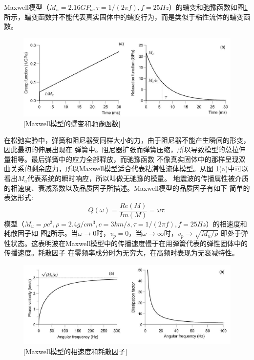 Maxwell模型（$M_u=2.16GP_a,\tau=1/(2\pi f),f=25Hz$）的蠕变和驰豫函数如图\ref{fig:maxwell_creep}
所示，蠕变函数并不能代表真实固体中的蠕变行为，而是类似于粘性流体的蠕变函数。
\begin{figure}[!htbp]
	    \centering
		\includegraphics[width=0.9\linewidth]{figure/maxwell_creep}
		[Maxwell模型的蠕变和驰豫函数]
		\label{fig:maxwell_creep}
\end{figure}
在松弛实验中，弹簧和阻尼器受同样大小的力，由于阻尼器不能产生瞬间的形变，因此最初的伸展出现在
弹簧中。阻尼器扩张而弹簧压缩，所以导致模型的总拉伸量相等。最后弹簧中的应力全部释放，而驰豫函数
不像真实固体中的那样呈现双曲关系的剩余应力，所以Maxwell模型适合代表粘滞性流体模型。从图
\ref{fig:maxwell_creep}(a)中可以看出$M_u$代表系统的瞬时响应，所以叫做无驰豫的模量。
地震波的传播属性被介质的相速度、衰减系数以及品质因子所描述。Maxwell模型的品质因子有如下
简单的表达形式:
\begin{equation}
	Q(\omega)=\frac{Re(M)}{Im(M)}=\omega\tau.
\end{equation}
模型（$M_u=\rho c^2, \rho=2.4g/cm^3, c=3km/s, \tau=1/(2\pi f), f=25Hz$）的相速度和耗散因子如
图\ref{fig:maxwell_vp}所示。当$\omega\to0$时，$v_p=0$，当$\omega\to\infty$时，$v_p\to\sqrt{M_u/\rho}$
即处于弹性状态。这表明波在Maxwell模型中的传播速度慢于在用弹簧代表的弹性固体中的传播速度。耗散因子
在零频率成分时为无穷大，在高频时表现为无衰减特性。
\begin{figure}[!htbp]
	    \centering
		\includegraphics[width=0.8\linewidth]{figure/maxwell_vp}
		[Maxwell模型的相速度和耗散因子]
		\label{fig:maxwell_vp}
\end{figure}


